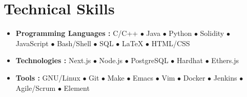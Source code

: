 \documentclass[letterpaper, 11pt]{article}
\newcommand{\technicalskill}[3] {
  \vspace{-1pt}
\item\small
  #1 \textbf{#2 : }{\footnotesize{#3}}
  \vspace{-2pt}
}
\newcommand{\bulletitem}[1] {{\tiny$\bullet$} #1}
\begin{document}
\section{Technical Skills}
\begin{itemize}[leftmargin=*]
  \technicalskill
  {}{Programming Languages}
  {C/C++ \bulletitem{Java} \bulletitem{Python} \bulletitem{Solidity} \bulletitem{JavaScript} \bulletitem{Bash/Shell} \bulletitem{SQL} \bulletitem{\LaTeX{}} \bulletitem{HTML/CSS}}

  \technicalskill
  {}{Technologies}
  {Next.js \bulletitem{Node.js} \bulletitem{PostgreSQL} \bulletitem{Hardhat} \bulletitem{Ethers.js}}

  \technicalskill
  {}{Tools}
  {GNU/Linux \bulletitem{Git} \bulletitem{Make} \bulletitem{Emacs} \bulletitem{Vim} \bulletitem{Docker} \bulletitem{Jenkins} \bulletitem{Agile/Scrum} \bulletitem{Element}}
\end{itemize}
\end{document}
